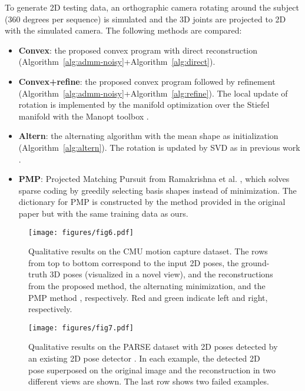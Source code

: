 \documentclass[10pt,journal,cspaper,compsoc]{IEEEtran}
\newcommand{\refAlg}[1]{Algorithm~\ref{#1}}
\begin{document}
To generate 2D testing data, an orthographic camera rotating around the subject (360 degrees per sequence) is simulated and the 3D joints are projected to 2D with the simulated camera. The following methods are compared:
\begin{itemize}
\item {\bf Convex}: the proposed convex program with direct reconstruction (\refAlg{alg:admm-noisy}+\refAlg{alg:direct}).
\item {\bf Convex+refine}: the proposed convex program followed by refinement (\refAlg{alg:admm-noisy}+\refAlg{alg:refine}). The local update of rotation is implemented by the manifold optimization over the Stiefel manifold with the Manopt toolbox \cite{boumal2014manopt}.
\item {\bf Altern}: the alternating algorithm with the mean shape as initialization (\refAlg{alg:altern}). The rotation is updated by SVD as in previous work \cite{ramakrishna2012reconstructing,fan2014pose,zhou2014sptio}.
\item {\bf PMP}: Projected Matching Pursuit from Ramakrishna et al. \cite{ramakrishna2012reconstructing}, which solves sparse coding by greedily selecting basis shapes instead of  minimization. The dictionary for PMP is constructed by the method provided in the original paper but with the same training data as ours.
\end{itemize}

\begin{figure*}
\centering
\texttt{[image: figures/fig6.pdf]}
  \caption{Qualitative results on the CMU motion capture dataset. The rows from top to bottom correspond to the input 2D poses, the ground-truth 3D poses (visualized in a novel view), and the reconstructions from the proposed method, the alternating minimization, and the PMP method \cite{ramakrishna2012reconstructing}, respectively. Red and green indicate left and right, respectively. }
  \label{fig:mocap-qual}
\end{figure*}

\begin{figure*}
  \centering
  \texttt{[image: figures/fig7.pdf]}
  \caption{Qualitative results on the PARSE dataset with 2D poses detected by an existing 2D pose detector \cite{yang2011articulated}. In each example, the detected 2D pose superposed on the original image and the reconstruction in two different views are shown. The last row shows two failed examples.}\label{fig:parse}
\end{figure*}
\end{document}
